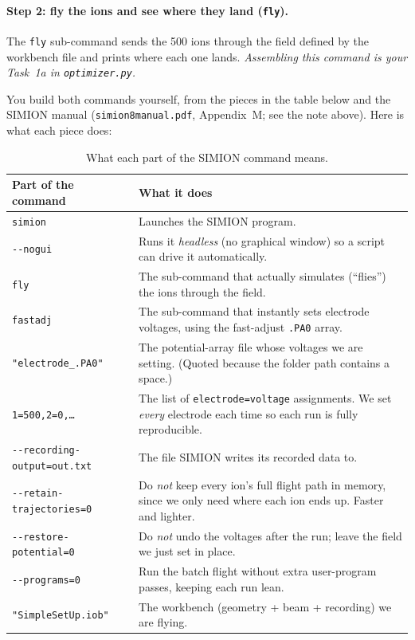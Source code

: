 \documentclass[11pt]{article}
\begin{document}
\paragraph{Step 2: fly the ions and see where they land (\texttt{fly}).}
The \texttt{fly} sub-command sends the 500 ions through the field defined by the
workbench file and prints where each one lands. \emph{Assembling this command is
your Task~1a in \texttt{optimizer.py}.}

\noindent You build both commands yourself, from the pieces in the table below
and the SIMION manual (\texttt{simion8manual.pdf}, Appendix~M; see the note
above). Here is what each piece does:

\begin{table}[h]
\centering
\caption{What each part of the SIMION command means.}
\renewcommand{\arraystretch}{1.25}
\begin{tabular}{p{} p{}}
\toprule
\textbf{Part of the command} & \textbf{What it does} \\
\midrule
\texttt{simion} & Launches the SIMION program. \\
\texttt{-{}-nogui} & Runs it \emph{headless} (no graphical window) so a script
  can drive it automatically. \\
\texttt{fly} & The sub-command that actually simulates (``flies'') the ions
  through the field. \\
\texttt{fastadj} & The sub-command that instantly sets electrode voltages,
  using the fast-adjust \texttt{.PA0} array. \\
\texttt{"electrode\_.PA0"} & The potential-array file whose voltages we are
  setting. (Quoted because the folder path contains a space.) \\
\texttt{1=500,2=0,\dots} & The list of \texttt{electrode=voltage} assignments.
  We set \emph{every} electrode each time so each run is fully reproducible. \\
\texttt{-{}-recording-output=out.txt} & The file SIMION writes its recorded
  data to. \\
\texttt{-{}-retain-trajectories=0} & Do \emph{not} keep every ion's full flight
  path in memory, since we only need where each ion ends up. Faster and lighter. \\
\texttt{-{}-restore-potential=0} & Do \emph{not} undo the voltages after the
  run; leave the field we just set in place. \\
\texttt{-{}-programs=0} & Run the batch flight without extra user-program
  passes, keeping each run lean. \\
\texttt{"SimpleSetUp.iob"} & The workbench (geometry + beam + recording) we
  are flying. \\
\bottomrule
\end{tabular}
\end{table}
\end{document}
